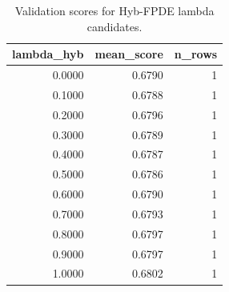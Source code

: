 \begin{table}[t]
\caption{Validation scores for Hyb-FPDE lambda candidates.}
\label{tab:lambda_distribution_computed}
\centering
\begin{tabular}{rrr}
\toprule
lambda\_hyb & mean\_score & n\_rows \\
\midrule
0.0000 & 0.6790 & 1 \\
0.1000 & 0.6788 & 1 \\
0.2000 & 0.6796 & 1 \\
0.3000 & 0.6789 & 1 \\
0.4000 & 0.6787 & 1 \\
0.5000 & 0.6786 & 1 \\
0.6000 & 0.6790 & 1 \\
0.7000 & 0.6793 & 1 \\
0.8000 & 0.6797 & 1 \\
0.9000 & 0.6797 & 1 \\
1.0000 & 0.6802 & 1 \\
\bottomrule
\end{tabular}

\end{table}
